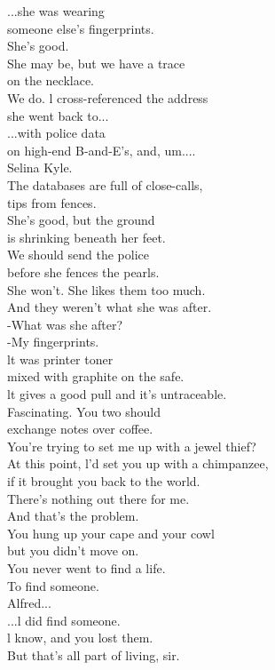 \documentclass{article}
\begin{document}
\begin{multicols}{3}
...she was wearing\\
someone else's fingerprints.\\
She's good.\\
She may be, but we have a trace\\
on the necklace.\\
We do. l cross-referenced the address\\
she went back to...\\
...with police data\\
on high-end B-and-E's, and, um....\\
Selina Kyle.\\
The databases are full of close-calls,\\
tips from fences.\\
She's good, but the ground\\
is shrinking beneath her feet.\\
We should send the police\\
before she fences the pearls.\\
She won't. She likes them too much.\\
And they weren't what she was after.\\
-What was she after?\\
-My fingerprints.\\
lt was printer toner\\
mixed with graphite on the safe.\\
lt gives a good pull and it's untraceable.\\
Fascinating. You two should\\
exchange notes over coffee.\\
You're trying to set me up with a jewel thief?\\
At this point, l'd set you up with a chimpanzee,\\
if it brought you back to the world.\\
There's nothing out there for me.\\
And that's the problem.\\
You hung up your cape and your cowl\\
but you didn't move on.\\
You never went to find a life.\\
To find someone.\\
Alfred...\\
...l did find someone.\\
l know, and you lost them.\\
But that's all part of living, sir.\\

\end{multicols}
\end{document}
